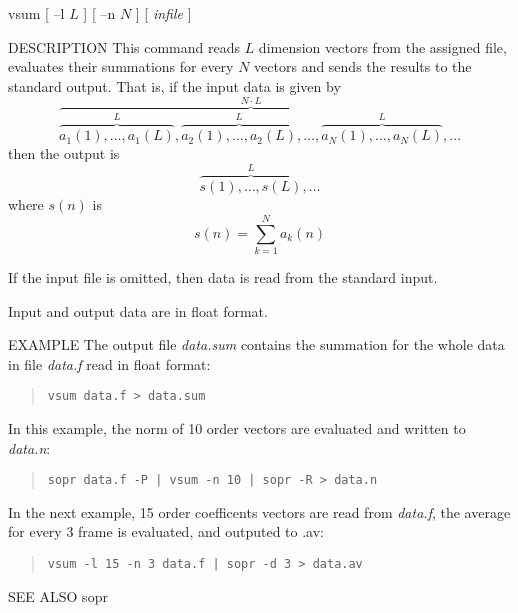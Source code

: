 
\begin{synopsis}
\item[vsum] [ --l $L$ ] [ --n $N$ ] [ {\em infile} ]
\end{synopsis}

\begin{qsection}{DESCRIPTION}
This command reads $L$ dimension vectors from the assigned file,
evaluates their summations for every $N$ vectors and sends the
results to the standard output.
That is, if the input data is given by
\begin{displaymath}
\overbrace{
  \overbrace{a_1(1),\ldots,a_1(L)}^{L},
  \overbrace{a_2(1),\ldots,a_2(L)}^{L},\ldots,
  \overbrace{a_N(1),\ldots,a_N(L)}^{L}
}^{N \cdot L},\ldots
\end{displaymath}
then the output is 
\begin{displaymath}
  \overbrace{s(1),\ldots,s(L)}^{L},\ldots
\end{displaymath}
where $s(n)$ is
\begin{displaymath}
  s(n)=\sum_{k=1}^{N} a_k(n)
\end{displaymath}
\par
If the input file is omitted, then data is read from the standard input.
\par
Input and output data are in float format.
\end{qsection}

\begin{options}
\end{options}

\begin{qsection}{EXAMPLE}
The output file {\em data.sum} contains the summation for
the whole data in file {\em data.f} read in float format:
\begin{quote}
  \verb!vsum data.f > data.sum!
\end{quote}
\par
In this example, the norm of 10 order vectors are
evaluated and written to {\em data.n}:
\begin{quote}
  \verb!sopr data.f -P | vsum -n 10 | sopr -R > data.n!
\end{quote}
\par
In the next example, 15 order coefficents vectors are read
from {\em data.f}, the average for every 3 frame is evaluated,
and outputed to {\data.av}:
\begin{quote}
  \verb!vsum -l 15 -n 3 data.f | sopr -d 3 > data.av!
\end{quote}
\end{qsection}

\begin{qsection}{SEE ALSO}
  sopr
\end{qsection}
